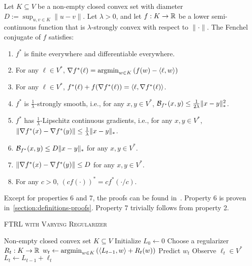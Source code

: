 \begin{proposition}
\label{proposition:conjugate-properties}
Let $K \subseteq V$ be a non-empty closed convex set with diameter
$D:=\sup_{u,v \in K} \|u-v\|$.  Let $\lambda > 0$, and let $f:K \to \mathbb{R}$ be a
lower semi-continuous function that is $\lambda$-strongly convex with respect
to $\|\cdot\|$.  The Fenchel conjugate of $f$ satisfies:
\begin{enumerate}

\item $f^*$ is finite everywhere and differentiable everywhere.

\item For any $\ell \in V^*$, $\nabla f^*(\ell) = \operatorname*{argmin}_{w \in K} \left( f(w) - \langle \ell, w \rangle \right)$

\item For any $\ell \in V^*$, $f^*(\ell) + f(\nabla f^*(\ell)) = \langle \ell, \nabla f^*(\ell) \rangle$.

\item $f^*$ is $\frac{1}{\lambda}$-strongly smooth, i.e., for any $x,y \in
V^*$, $\mathcal{B}_{f^*}(x, y) \le \frac{1}{2\lambda} \|x - y\|_*^2$.

\item $f^*$ has $\frac{1}{\lambda}$-Lipschitz continuous gradients, i.e.,
for any $x,y \in V^*$,
$\|\nabla f^*(x) - \nabla f^*(y)\| \le \frac{1}{\lambda} \|x - y\|_*$.

\item $\mathcal{B}_{f^*}(x,y) \le D\|x-y\|_*$ for any $x,y \in V^*$.

\item $\|\nabla f^*(x) - \nabla f^*(y)\| \le D$ for any $x,y \in V^*$.

\item For any $c > 0$, $(cf(\cdot))^* = cf^*(\cdot/c)$.
\end{enumerate}
\end{proposition}

Except for properties 6 and 7, the proofs can be found
in~\cite{Shalev-Shwartz-2007}.  Property 6 is proven
in~\ref{section:definitions-proofs}. Property 7 trivially follows from property
2.

\begin{algorithm}[t]
\caption{\textsc{FTRL with Varying Regularizer}}
\label{algorithm:ftrl-varying-regularizer}
\begin{algorithmic}[1]
\REQUIRE Non-empty closed convex set $K \subseteq V$
\STATE Initialize $L_0 \leftarrow 0$
\STATE Choose a regularizer $R_t:K \to \mathbb{R}$
\STATE $w_t \leftarrow \operatorname*{argmin}_{w \in K} \left( \langle L_{t-1}, w \rangle + R_t(w) \right)$
\STATE Predict $w_t$
\STATE Observe $\ell_t \in V^*$
\STATE $L_t \leftarrow L_{t-1} + \ell_t$
\ENDFOR
\end{algorithmic}
\end{algorithm}

